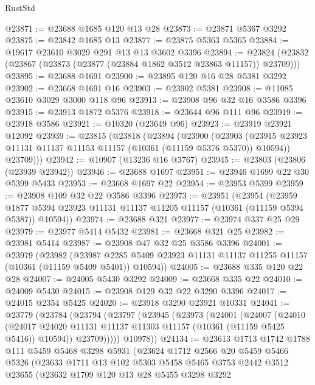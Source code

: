 \begin{lexlean}{RustStd}
\begin{coremodule}
@23871 := @23688 @1685 @120 @13 @28
@23873 := @23871 @5367 @3292
@23875 := @23842 @1685 @13
@23877 := @23875 @5363 @5365
@23884 := @19617 @23610 @3029 @291 @13 @13 @3602 @3396
@23894 := @23824 (@23832 (@23867 (@23873 (@23877 (@23884 @1862 @3512 @23863 @11157)) @23709)))
@23895 := @23688 @1691
@23900 := @23895 @120 @16 @28 @5381 @3292
@23902 := @23668 @1691 @16
@23903 := @23902 @5381
@23908 := @11085 @23610 @3029 @3000 @118 @96
@23913 := @23908 @96 @32 @16 @3586 @3396
@23915 := @23913 @1872 @5376
@23918 := @23644 @96 @111 @96
@23919 := @23918 @3586
@23921 := @10320 (@23649 @96)
@23923 := @23919 @23921 @12092
@23939 := @23815
    (@23818
      (@23894
        (@23900
          (@23903 (@23915 @23923 @11131 @11137 @11153 @11157 (@10361 (@11159 @5376 @5370)) @10594))
          @23709)))
@23942 := @10907 (@13236 @16 @3767)
@23945 := @23803 (@23806 (@23939 @23942))
@23946 := @23688 @1697
@23951 := @23946 @1699 @22 @30 @5399 @5433
@23953 := @23668 @1697 @22
@23954 := @23953 @5399
@23959 := @23908 @109 @32 @22 @3586 @3396
@23973 := @23951
    (@23954
      (@23959 @1877 @5394 @23923 @11131 @11137 @11205 @11157 (@10361 (@11159 @5394 @5387)) @10594))
@23974 := @23688 @321
@23977 := @23974 @337 @25 @29
@23979 := @23977 @5414 @5432
@23981 := @23668 @321 @25
@23982 := @23981 @5414
@23987 := @23908 @47 @32 @25 @3586 @3396
@24001 := @23979
    (@23982
      (@23987 @2285 @5409 @23923 @11131 @11137 @11255 @11157 (@10361 (@11159 @5409 @5401)) @10594))
@24005 := @23688 @335 @120 @22 @28
@24007 := @24005 @5430 @3292
@24009 := @23668 @335 @22
@24010 := @24009 @5430
@24015 := @23908 @129 @32 @22 @3290 @3396
@24017 := @24015 @2354 @5425
@24020 := @23918 @3290 @23921 @10331
@24041 := @23779
    (@23784
      (@23794
        (@23797
          (@23945
            (@23973
              (@24001
                (@24007
                  (@24010
                    (@24017
                      @24020
                      @11131
                      @11137
                      @11303
                      @11157
                      (@10361 (@11159 @5425 @5416))
                      @10594))
                  @23709)))))
        @10978))
@24134 := @23613
    @1713
    @1742
    @1788
    @111
    @5459
    @5468
    @3298
    @5931
    (@23624
      @1712
      @2566
      @20
      @5459
      @5466
      @5326
      (@23633
        @1711
        @13
        @102
        @5303
        @5458
        @5465
        @3753
        @2442
        @3512
        @23655
        (@23632
          @1709
          @120
          @13
          @28
          @5455
          @3298
          @3292

\end{coremodule}
\end{lexlean}
